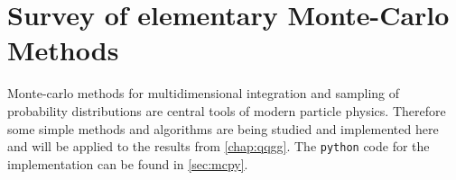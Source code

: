 
\chapter{Survey of elementary Monte-Carlo Methods}%
\label{chap:mc}

Monte-carlo methods for multidimensional integration and sampling of
probability distributions are central tools of modern particle
physics. Therefore some simple methods and algorithms are being
studied and implemented here and will be applied to the results
from \cref{chap:qqgg}. The \verb|python| code for the implementation
can be found in \cref{sec:mcpy}.
